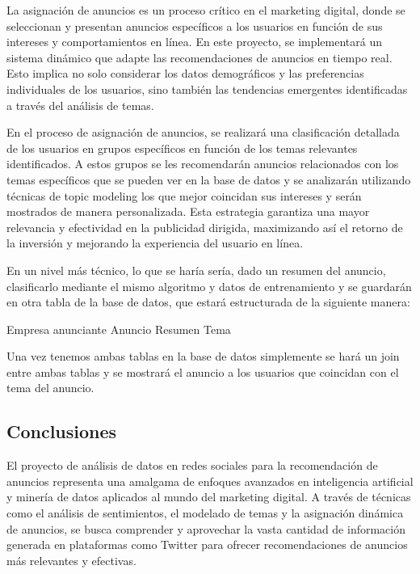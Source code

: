 \documentclass[
  letterpaper,
  DIV=11,
  numbers=noendperiod]{scrartcl}
\begin{document}
La asignación de anuncios es un proceso crítico en el marketing digital,
donde se seleccionan y presentan anuncios específicos a los usuarios en
función de sus intereses y comportamientos en línea. En este proyecto,
se implementará un sistema dinámico que adapte las recomendaciones de
anuncios en tiempo real. Esto implica no solo considerar los datos
demográficos y las preferencias individuales de los usuarios, sino
también las tendencias emergentes identificadas a través del análisis de
temas.

En el proceso de asignación de anuncios, se realizará una clasificación
detallada de los usuarios en grupos específicos en función de los temas
relevantes identificados. A estos grupos se les recomendarán anuncios
relacionados con los temas específicos que se pueden ver en la base de
datos y se analizarán utilizando técnicas de topic modeling los que
mejor coincidan sus intereses y serán mostrados de manera personalizada.
Esta estrategia garantiza una mayor relevancia y efectividad en la
publicidad dirigida, maximizando así el retorno de la inversión y
mejorando la experiencia del usuario en línea.

En un nivel más técnico, lo que se haría sería, dado un resumen del
anuncio, clasificarlo mediante el mismo algoritmo y datos de
entrenamiento y se guardarán en otra tabla de la base de datos, que
estará estructurada de la siguiente manera:

Empresa anunciante \textbar{} Anuncio \textbar{} Resumen \textbar{} Tema
\textbar{}

Una vez tenemos ambas tablas en la base de datos simplemente se hará un
join entre ambas tablas y se mostrará el anuncio a los usuarios que
coincidan con el tema del anuncio.

\subsection{Conclusiones}\label{conclusiones}

El proyecto de análisis de datos en redes sociales para la recomendación
de anuncios representa una amalgama de enfoques avanzados en
inteligencia artificial y minería de datos aplicados al mundo del
marketing digital. A través de técnicas como el análisis de
sentimientos, el modelado de temas y la asignación dinámica de anuncios,
se busca comprender y aprovechar la vasta cantidad de información
generada en plataformas como Twitter para ofrecer recomendaciones de
anuncios más relevantes y efectivas.
\end{document}
